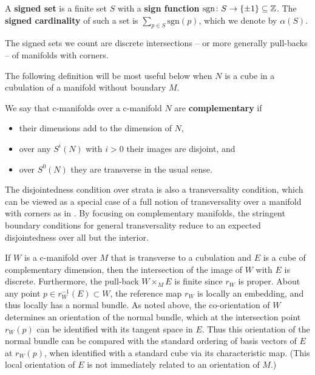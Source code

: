 \begin{definition}
	A \textbf{signed set} is a finite set $S$ with a \textbf{sign function} $\mathrm{sgn} \colon S \to \{\pm 1\} \subseteq \mathbb{Z}$.
	The \textbf{signed cardinality} of such a set is $\sum_{p \in S} \mathrm{sgn}(p)$, which we denote by $\alpha(S)$.
\end{definition}

The signed sets we count are discrete intersections -- or more generally pull-backs -- of manifolds with corners.

The following definition will be most useful below when $N$ is a cube in a cubulation of a manifold without boundary $M$.

\begin{definition}\label{D:complementary}
	We say that c-manifolds over a c-manifold $N$ are \textbf{complementary} if
	\begin{itemize}
		\item their dimensions add to the dimension of $N$,
		\item over any $S^i(N)$ with $i>0$ their images are disjoint, and
		\item over $S^0(N)$ they are transverse in the usual sense.
	\end{itemize}
\end{definition}

The disjointedness condition over strata is also a transversality condition, which can be viewed as a special case of a full notion of transversality over a manifold with corners as in \cite{Joy12}.
By focusing on complementary manifolds, the stringent boundary conditions for general transversality reduce to an expected disjointedness over all but the interior.

If $W$ is a c-manifold over $M$ that is transverse to a cubulation and $E$ is a cube of complementary dimension, then the intersection of the image of $W$ with $E$ is discrete.
Furthermore, the pull-back $W \times_M E$ is finite since $r_W$ is proper.
About any point $p \in r_W^{-1}(E) \subset W$, the reference map $r_W$ is locally an embedding, and thus locally has a normal bundle.
As noted above, the co-orientation of $W$ determines an orientation of the normal bundle, which at the intersection point $r_W(p)$ can be identified with its tangent space in $E$.
Thus this orientation of the normal bundle can be compared with the standard ordering of basis vectors of $E$ at $r_W(p)$, when identified with a standard cube via its characteristic map.
(This local orientation of $E$ is not immediately related to an orientation of $M$.)

